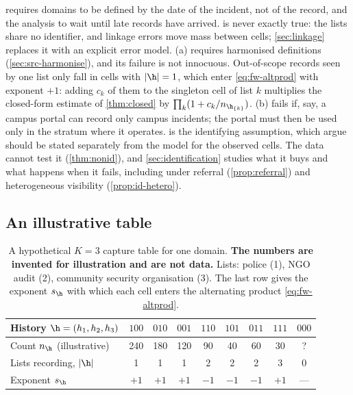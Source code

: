  requires domains to be defined by the date of the incident, not of the record, and the analysis to wait until late records have arrived.  is never exactly true: the lists share no identifier, and linkage errors move mass between cells; \cref{sec:linkage} replaces it with an explicit error model. (a) requires harmonised definitions (\cref{sec:src-harmonise}), and its failure is not innocuous. Out-of-scope records seen by one list only fall in cells with $|\h|=1$, which enter \eqref{eq:fw-altprod} with exponent $+1$: adding $c_k$ of them to the singleton cell of list $k$ multiplies the closed-form estimate of \cref{thm:closed} by $\prod_k(1+c_k/n_{\h_{\{k\}}})$. (b) fails if, say, a campus portal can record only campus incidents; the portal must then be used only in the stratum where it operates.  is the identifying assumption, which \citet{aleshinguendel2024} argue should be stated separately from the model for the observed cells. The data cannot test it (\cref{thm:nonid}), and \cref{sec:identification} studies what it buys and what happens when it fails, including under referral (\cref{prop:referral}) and heterogeneous visibility (\cref{prop:id-hetero}).

\subsection{An illustrative table}\label{sec:fw-example}

\begin{table}[t]
\centering
\caption{A hypothetical $K=3$ capture table for one domain. \textbf{The numbers are invented for illustration and are not data.} Lists: police (1), NGO audit (2), community security organisation (3). The last row gives the exponent $s_{\h}$ with which each cell enters the alternating product \eqref{eq:fw-altprod}.}
\label{tab:fw-example}
\begin{tabular}{@{}lcccccccc@{}}
\toprule
History $\h=(h_1,h_2,h_3)$ & $100$ & $010$ & $001$ & $110$ & $101$ & $011$ & $111$ & $000$\\
\midrule
Count $n_{\h}$ (illustrative) & 240 & 180 & 120 & 90 & 40 & 60 & 30 & ?\\
Lists recording, $|\h|$ & 1 & 1 & 1 & 2 & 2 & 2 & 3 & 0\\
Exponent $s_{\h}$ & $+1$ & $+1$ & $+1$ & $-1$ & $-1$ & $-1$ & $+1$ & ---\\
\bottomrule
\end{tabular}
\end{table}

